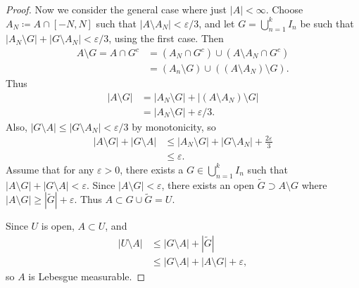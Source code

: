 \documentclass[12pt]{article}
\theoremstyle{definition}
\begin{document}
\begin{proof}
	Now we consider the general case where just $|A| < \infty$.
	Choose $A_N \coloneq A \cap [-N, N]$ such that $|A \setminus A_N| < \varepsilon/3$, and let $G = \bigcup_{n=1}^k I_n$ be such that $|A_N \setminus G| + |G \setminus A_N| < \varepsilon/3$, using the first case.
	Then \begin{align*}
		A \setminus G = A \cap G^c & = (A_N \cap G^c) \cup (A \setminus A_N \cap G^c)          \\
		                           & = (A_n \setminus G) \cup ((A \setminus A_N) \setminus G).
	\end{align*}
	Thus \begin{align*}
		|A \setminus G| & = |A_N \setminus G| + |(A \setminus A_N) \setminus G| \\
		                & = |A_N \setminus G| + \varepsilon / 3.
	\end{align*}
	Also, $|G \setminus A| \leq |G \setminus A_N| < \varepsilon/3$ by monotonicity, so \begin{align*}
		|A \setminus G| + |G \setminus A| & \leq |A_N \setminus G| + |G \setminus A_N| + \frac{2\varepsilon}{3} \\
		                                  & \leq \varepsilon.
	\end{align*}
	Assume that for any $\varepsilon > 0$, there exists a $G \in \bigcup_{n=1}^k I_n$ such that $|A \setminus G| + |G \setminus A| < \varepsilon$.
	Since $|A \setminus G| < \varepsilon$, there exists an open $\widetilde{G} \supset A \setminus G$ where $|A \setminus G| \geq |\widetilde{G}| + \varepsilon$.
	Thus $A \subset G \cup \widetilde{G} = U$.

	Since $U$ is open, $A \subset U$, and \begin{align*}
		|U \setminus A| & \leq |G \setminus A| + |\widetilde{G}|                \\
		                & \leq |G \setminus A| + |A \setminus G| + \varepsilon,
	\end{align*}
	so $A$ is Lebesgue measurable.
\end{proof}
\end{document}
